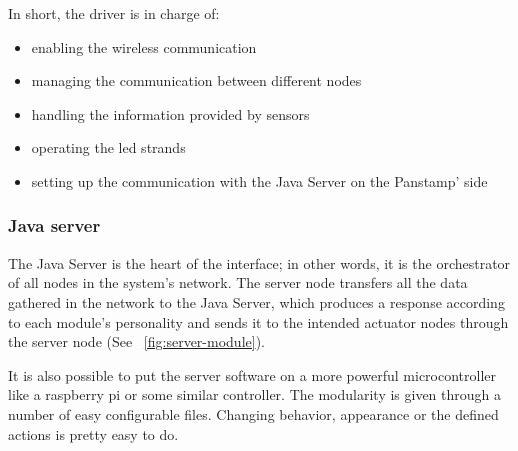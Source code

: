 In short, the driver is in charge of:
\begin{itemize}
\item enabling the wireless communication
\item managing the communication between different nodes
\item handling the information provided by sensors 
\item operating the led strands
\item setting up the communication with the Java Server on the Panstamp' side
\end{itemize}

\subsubsection{Java server}

The Java Server is the heart of the interface; in other words, it is the orchestrator of all nodes in the system's network. The server node transfers all the data gathered in the network to the Java Server, which produces a response according to each module's personality and sends it to the intended actuator nodes through the server node (See ~\ref{fig:server-module}).  


It is also possible to put the server software on a more powerful microcontroller like a raspberry pi or some similar controller.
The modularity is given through a number of easy configurable files. Changing behavior, appearance or the defined actions is pretty easy to do.

